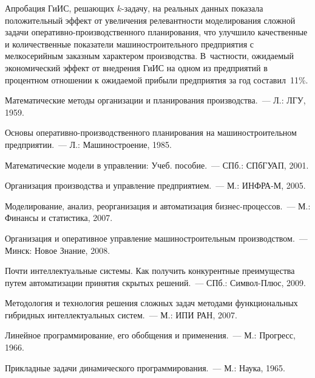 \begin{multicols}{2}
  Апробация ГиИС, решающих $k$-задачу, на реальных данных показала 
положительный эффект от увеличения релевантности моделирования сложной 
задачи опе\-ра\-тив\-но-про\-из\-вод\-ст\-вен\-но\-го пла\-нирования, что 
улучшило качественные и ко\-личественные показатели машиностроительного\linebreak 
предприятия с мелкосерийным заказным характером производства. 
В~частности, ожидаемый экономический эффект от внедрения ГиИС на одном из 
предприятий в процентном отношении к ожидаемой прибыли предприятия за 
год составил~11\%.

{\small\frenchspacing
{%
\begin{thebibliography}{99}

Математические методы организации и планирования производства.~--- Л.: ЛГУ, 1959.



Основы оперативно-про\-из\-вод\-ст\-вен\-но\-го планирования на машиностроительном 
предприятии.~--- Л.: Машиностроение, 1985.

Математические модели в управлении: Учеб. пособие.~--- СПб.: \mbox{СПбГУАП}, 2001.


Организация производства и управление предприятием.~--- М.: ИНФРА-М, 2005.

Моделирование, анализ, реорганизация и автоматизация биз\-нес-про\-цес\-сов.~--- М.: 
Финансы и статистика, 2007.

Организация и оперативное управление машиностроительным производством.~--- Минск: 
Новое Знание, 2008.

Почти интеллектуальные сис\-те\-мы. Как получить конкурентные преимущества путем 
автоматизации принятия скрытых решений.~--- СПб.: Сим\-вол-Плюс, 2009.


Методология и технология решения сложных задач методами функциональных гибридных 
интеллектуальных систем.~--- М.: ИПИ РАН, 2007.

Линейное программирование, его обобщения и применения.~--- М.: Прогресс, 1966.

Прикладные задачи динамического программирования.~--- М.: Наука, 1965.


\end{thebibliography}}}
\end{multicols}
